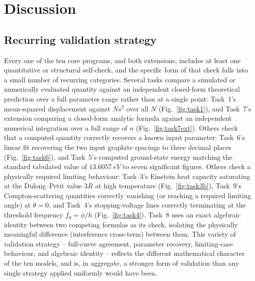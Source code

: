 \documentclass[11pt]{article}
\begin{document}
\section{Discussion}
\label{sec:discussion}

\subsection{Recurring validation strategy}
Every one of the ten core programs, and both extensions, includes at least one quantitative or structural self-check, and the specific form of that check falls into a small number of recurring categories. Several tasks compare a simulated or numerically evaluated quantity against an independent closed-form theoretical prediction over a full parameter range rather than at a single point: Task~1's mean-squared displacement against $Ns^2$ over all $N$ (Fig.~\ref{fig:task1}), and Task~7's extension comparing a closed-form analytic formula against an independent numerical integration over a full range of $n$ (Fig.~\ref{fig:task7ext}). Others check that a computed quantity correctly recovers a known input parameter: Task~6's linear fit recovering the two input graphite spacings to three decimal places (Fig.~\ref{fig:task6}), and Task~5's computed ground-state energy matching the standard tabulated value of $\SI{13.6057}{eV}$ to seven significant figures. Others check a physically required limiting behaviour: Task~3's Einstein heat capacity saturating at the Dulong--Petit value $3R$ at high temperature (Fig.~\ref{fig:task3b}), Task~9's Compton-scattering quantities correctly vanishing (or reaching a required limiting angle) at $\theta=0$, and Task~4's stopping-voltage lines correctly terminating at the threshold frequency $f_0=\phi/h$ (Fig.~\ref{fig:task4}). Task~8 uses an exact algebraic identity between two competing formulas as its check, isolating the physically meaningful difference (interference cross-term) between them. This variety of validation strategy -- full-curve agreement, parameter recovery, limiting-case behaviour, and algebraic identity -- reflects the different mathematical character of the ten models, and is, in aggregate, a stronger form of validation than any single strategy applied uniformly would have been.
\end{document}
